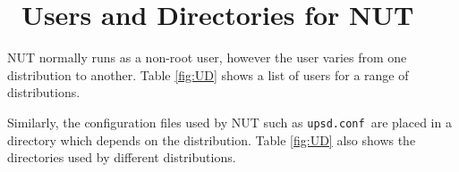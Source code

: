 \documentclass[12pt]{article}
\newlength{\headersep}\setlength{\headersep}{3mm}
\newcommand{\Hsep}{\hspace{\headersep}}
\newcommand{\newcolumn}{\vfill\eject}
\newcommand{\upsdconf}{\textcolor{UPSDCOLOUR}{\texttt{upsd.conf}}}
\begin{document}




\section{\Hsep\ Users and Directories for NUT}\label{section:UD}

NUT normally runs as a non-root user, however the user varies from one
distribution to another.  Table \ref{fig:UD} shows a list of users for a range
of distributions.

Similarly, the configuration files used by NUT such as \upsdconf\ are placed
in a directory which depends on the distribution.  Table \ref{fig:UD} also
shows the directories used by different distributions.
\end{document}
